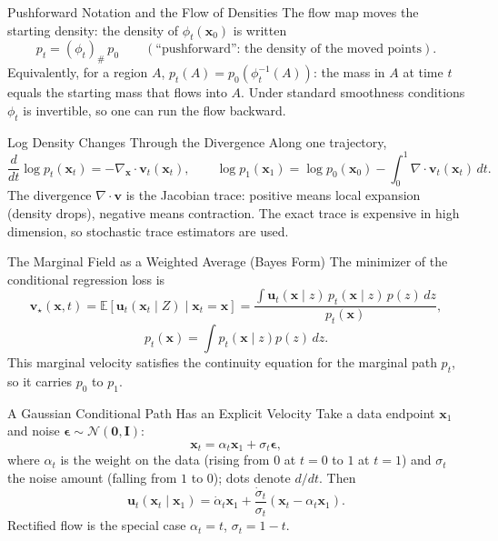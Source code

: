 \documentclass{ntuabeamer}
\begin{document}
\appendix
{}

\begin{frame}{Pushforward Notation and the Flow of Densities}
  The flow map moves the starting density: the density of \(\phi_t(\mathbf x_0)\) is written
  \[
    p_t=(\phi_t)_\#\,p_0 \qquad(\text{``pushforward'': the density of the moved points}).
  \]
  Equivalently, for a region \(A\), \(p_t(A)=p_0(\phi_t^{-1}(A))\): the mass in \(A\) at time \(t\) equals the starting mass that flows into \(A\).
  Under standard smoothness conditions \(\phi_t\) is invertible, so one can run the flow backward.
\end{frame}

\begin{frame}{Log Density Changes Through the Divergence}
  \small
  Along one trajectory,
  \[
    \frac{d}{dt}\log p_t(\mathbf x_t)=-\nabla_{\mathbf x}\!\cdot\mathbf v_t(\mathbf x_t),
    \qquad
    \log p_1(\mathbf x_1)=\log p_0(\mathbf x_0)-\int_0^1\nabla\!\cdot\mathbf v_t(\mathbf x_t)\,dt.
  \]
  The divergence \(\nabla\!\cdot\mathbf v\) is the Jacobian trace: positive means local expansion (density drops), negative means contraction.
  The exact trace is expensive in high dimension, so stochastic trace estimators are used.
\end{frame}

\begin{frame}{The Marginal Field as a Weighted Average (Bayes Form)}
  The minimizer of the conditional regression loss is
  \[
    \mathbf v_\star(\mathbf x,t)=\mathbb E[\mathbf u_t(\mathbf x_t\mid Z)\mid\mathbf x_t=\mathbf x]
      =\frac{\int\mathbf u_t(\mathbf x\mid z)\,p_t(\mathbf x\mid z)\,p(z)\,dz}{p_t(\mathbf x)},
  \]
  \[
    p_t(\mathbf x)=\int p_t(\mathbf x\mid z)p(z)\,dz.
  \]
  This marginal velocity satisfies the continuity equation for the marginal path \(p_t\), so it carries \(p_0\) to \(p_1\).
\end{frame}

\begin{frame}{A Gaussian Conditional Path Has an Explicit Velocity}
  Take a data endpoint \(\mathbf x_1\) and noise \(\boldsymbol\epsilon\sim\mathcal N(\mathbf0,\mathbf I)\):
  \[
    \mathbf x_t=\alpha_t\mathbf x_1+\sigma_t\boldsymbol\epsilon,
  \]
  where \(\alpha_t\) is the weight on the data (rising from \(0\) at \(t=0\) to \(1\) at \(t=1\)) and \(\sigma_t\) the noise amount (falling from \(1\) to \(0\)); dots denote \(d/dt\). Then
  \[
    \mathbf u_t(\mathbf x_t\mid\mathbf x_1)=\dot\alpha_t\mathbf x_1+\frac{\dot\sigma_t}{\sigma_t}(\mathbf x_t-\alpha_t\mathbf x_1).
  \]
  Rectified flow is the special case \(\alpha_t=t\), \(\sigma_t=1-t\).
\end{frame}
\end{document}
